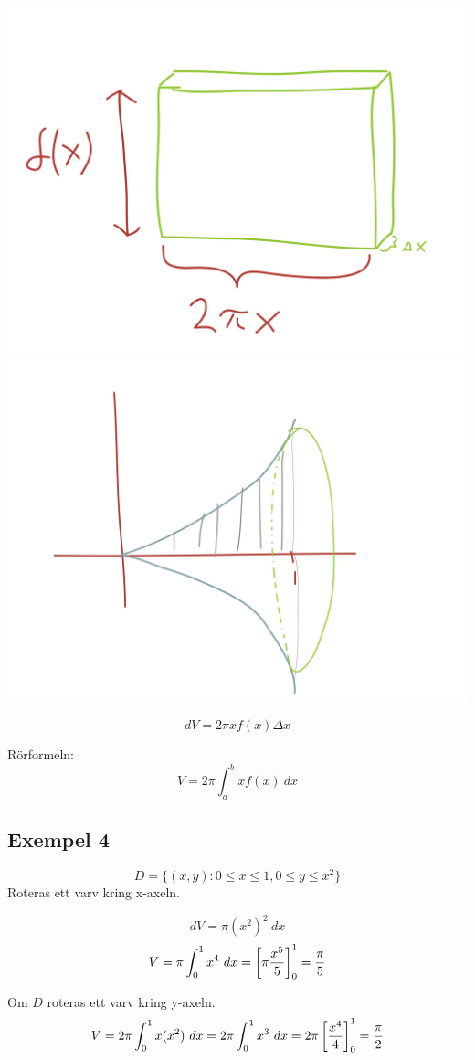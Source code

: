 \documentclass{article}
\begin{document}
\includegraphics[scale=0.1]{img/img16.jpg}
\includegraphics[scale=0.1]{img/img17.jpg}

$$ dV = 2\pi x f(x) \Delta x $$

Rörformeln:
$$ V = 2\pi\int^b_a{x f(x)\ dx} $$

\subsection{Exempel 4}

$$ D=\{ (x,y) : 0\le x\le 1, 0\le y\le x^2 \} $$
Roteras ett varv kring x-axeln.

$$ dV = \pi(x^2)^2\ dx$$
$$ V = \pi \int^1_0{x^4\ dx} = \left[\pi\frac{x^5}{5}\right]^1_0 = \frac{\pi}{5} $$

Om $D$ roteras ett varv kring y-axeln.
$$ V=2\pi\int^1_0{x(x^2)\ dx}  = 2\pi\int^1_0{x^3\ dx} = 2\pi\bra{x^4\over 4}^1_0 = \f \pi 2$$
\end{document}
